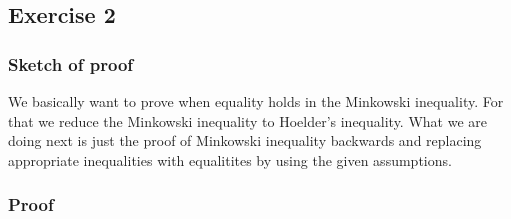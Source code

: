 \documentclass[a4paper]{article}
\begin{document}
\subsection*{Exercise 2}


\subsubsection*{Sketch of proof}

We basically want to prove when equality holds in the Minkowski inequality. For that we reduce the Minkowski inequality to Hoelder's inequality. What we are doing next is just the proof of Minkowski inequality backwards and replacing appropriate inequalities with equalitites by using the given assumptions.

\subsubsection*{Proof}
\end{document}
